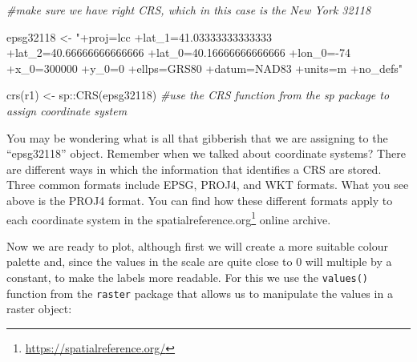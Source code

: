 \documentclass[
  krantz2]{krantz}
\makeatletter
\newenvironment{Shaded}{\begin{snugshade}}{\end{snugshade}}
\newcommand{\AttributeTok}[1]{\textcolor[rgb]{0.61,0.61,0.61}{#1}}
\newcommand{\CommentTok}[1]{\textcolor[rgb]{0.37,0.37,0.37}{\textit{#1}}}
\newcommand{\FloatTok}[1]{\textcolor[rgb]{0.06,0.06,0.06}{#1}}
\newcommand{\FunctionTok}[1]{\textcolor[rgb]{0,0,0}{#1}}
\newcommand{\NormalTok}[1]{#1}
\newcommand{\OtherTok}[1]{\textcolor[rgb]{0.37,0.37,0.37}{#1}}
\newcommand{\SpecialCharTok}[1]{\textcolor[rgb]{0,0,0}{#1}}
\newcommand{\StringTok}[1]{\textcolor[rgb]{0.5,0.5,0.5}{#1}}
\renewcommand{\href}[2]{#2\footnote{\url{#1}}}
\newenvironment{kframe}{%
\medskip{}
\setlength{\fboxsep}{.8em}
 \def\at@end@of@kframe{}%
 \ifinner\ifhmode%
  \def\at@end@of@kframe{\end{minipage}}%
  \begin{minipage}{\columnwidth}%
 \fi\fi%
 \def\FrameCommand##1{\hskip\@totalleftmargin \hskip-\fboxsep
 \colorbox{shadecolor}{##1}\hskip-\fboxsep
     \hskip-\linewidth \hskip-\@totalleftmargin \hskip\columnwidth}%
 \MakeFramed {\advance\hsize-\width
   \@totalleftmargin\z@ \linewidth\hsize
   \@setminipage}}%
 {\par\unskip\endMakeFramed%
 \at@end@of@kframe}
\renewenvironment{Shaded}{\begin{kframe}}{\end{kframe}}
\makeatother
\begin{document}
\begin{Shaded}
\begin{Highlighting}[]
\CommentTok{\#make sure we have right CRS, which in this case is the New York 32118}

\NormalTok{epsg32118 }\OtherTok{\textless{}{-}} \StringTok{"+proj=lcc +lat\_1=41.03333333333333 +lat\_2=40.66666666666666 +lat\_0=40.16666666666666 +lon\_0={-}74 +x\_0=300000 +y\_0=0 +ellps=GRS80 +datum=NAD83 +units=m +no\_defs"} 

\FunctionTok{crs}\NormalTok{(r1) }\OtherTok{\textless{}{-}}\NormalTok{ sp}\SpecialCharTok{::}\FunctionTok{CRS}\NormalTok{(epsg32118) }\CommentTok{\#use the CRS function from the sp package to assign coordinate system}
\end{Highlighting}
\end{Shaded}

You may be wondering what is all that gibberish that we are assigning to the ``epsg32118'' object. Remember when we talked about coordinate systems? There are different ways in which the information that identifies a CRS are stored. Three common formats include EPSG, PROJ4, and WKT formats. What you see above is the PROJ4 format. You can find how these different formats apply to each coordinate system in the \href{https://spatialreference.org/}{spatialreference.org} online archive.

Now we are ready to plot, although first we will create a more suitable colour palette and, since the values in the scale are quite close to 0 will multiple by a constant, to make the labels more readable. For this we use the \texttt{values()} function from the \texttt{raster} package that allows us to manipulate the values in a raster object:

\begin{Shaded}
\end{Shaded}
\end{document}
